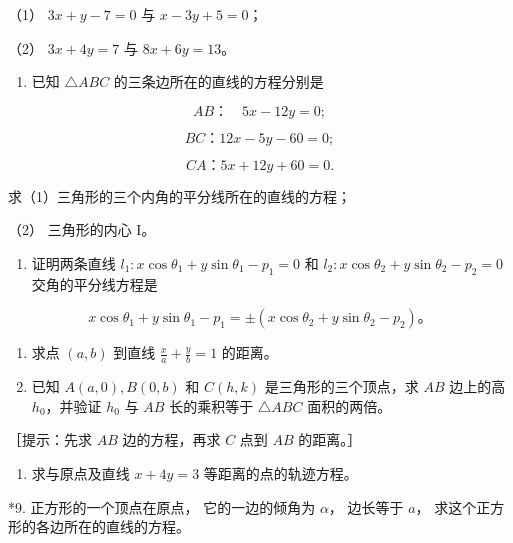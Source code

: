 （1） \(3x + y - 7 = 0\) 与 \(x - 3y + 5 = 0\)；

（2） \(3x + 4y = 7\) 与 \(8x + 6y = 13\)。

\begin{enumerate}
\def\labelenumi{\arabic{enumi}.}
\setcounter{enumi}{3}
\tightlist
\item
  已知 \(\triangle ABC\) 的三条边所在的直线的方程分别是
\end{enumerate}

\[
AB\text{：} \quad 5 x - 12 y = 0;
\]

\[
BC\text{：} 12 x - 5 y - 60 = 0;
\]

\[
CA\text{：} 5 x + 12 y + 60 = 0.
\]

求（1）三角形的三个内角的平分线所在的直线的方程；

（2） 三角形的内心 I。

\begin{enumerate}
\def\labelenumi{\arabic{enumi}.}
\setcounter{enumi}{4}
\tightlist
\item
  证明两条直线
  \(l_{1}: x \cos \theta_{1} + y \sin \theta_{1} - p_{1} = 0\) 和
  \(l_{2}: x \cos \theta_{2} + y \sin \theta_{2} - p_{2} = 0\)
  交角的平分线方程是
\end{enumerate}

\[
x \cos \theta_{1} + y \sin \theta_{1} - p_{1} = \pm (x \cos \theta_{2} + y \sin \theta_{2} - p_{2})\text{。}
\]

\begin{enumerate}
\def\labelenumi{\arabic{enumi}.}
\setcounter{enumi}{5}
\item
  求点 \((a, b)\) 到直线 \(\frac{x}{a} + \frac{y}{b} = 1\) 的距离。
\item
  已知 \(A(a, 0), B(0, b)\) 和 \(C(h, k)\) 是三角形的三个顶点，求 \(AB\)
  边上的高 \(h_0\)，并验证 \(h_0\) 与 \(AB\) 长的乘积等于
  \(\triangle ABC\) 面积的两倍。
\end{enumerate}

［提示：先求 \(AB\) 边的方程，再求 \(C\) 点到 \(AB\) 的距离。］

\begin{enumerate}
\def\labelenumi{\arabic{enumi}.}
\setcounter{enumi}{7}
\tightlist
\item
  求与原点及直线 \(x + 4y = 3\) 等距离的点的轨迹方程。
\end{enumerate}

*9. 正方形的一个顶点在原点， 它的一边的倾角为 \(\alpha\)， 边长等于
\(a\)， 求这个正方形的各边所在的直线的方程。

